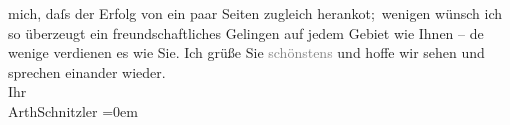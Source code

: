 \begin{ledgroupsized}[t]{13cm}
                    mich, daſs der Erfolg von ein paar Seiten zugleich heranko{\geminationm}t; wenigen wünsch ich so überzeugt ein
                    freundschaftliches Gelingen auf jedem Gebiet wie Ihnen – de{\geminationn} wenige verdienen es wie Sie.\pend
           \pstart
           Ich grüße Sie \textcolor{gray}{schönstens} und hoffe wir sehen und sprechen
                    einander wieder.{\\[\baselineskip]}Ihr{\\[\baselineskip]}\spacefill\mbox{ArthSchnitzler}\pend
           \leftskip=0em{}\endnumbering{}\end{ledgroupsized}  \newcommand{\dateiname}{L02536}\newcommand{\titel}{Arthur Schnitzler an Robert Adam, 12. 6. 1930}\newcommand{\editorInnen}{Martin Anton Müller und Gerd-Hermann Susen}
      